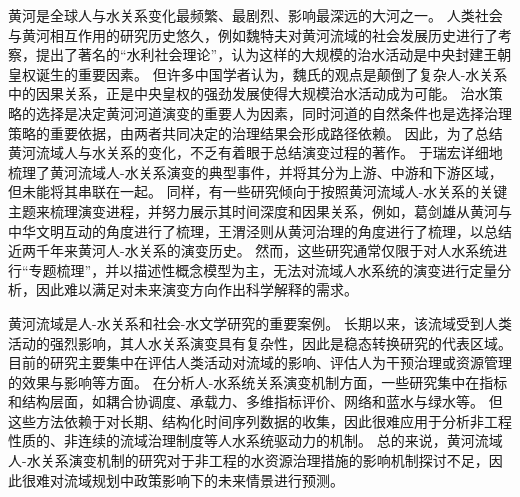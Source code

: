 
黄河是全球人与水关系变化最频繁、最剧烈、影响最深远的大河之一。
人类社会与黄河相互作用的研究历史悠久，例如魏特夫对黄河流域的社会发展历史进行了考察，提出了著名的“水利社会理论”，认为这样的大规模的治水活动是中央封建王朝皇权诞生的重要因素\cite{weitefu1989}。
但许多中国学者认为，魏氏的观点是颠倒了复杂人-水关系中的因果关系，正是中央皇权的强劲发展使得大规模治水活动成为可能\cite{jizhaoding1981}。
治水策略的选择是决定黄河河道演变的重要人为因素，同时河道的自然条件也是选择治理策略的重要依据，由两者共同决定的治理结果会形成路径依赖\cite{WangWeiJing2009}。
因此，为了总结黄河流域人与水关系的变化，不乏有着眼于总结演变过程的著作。
于瑞宏详细地梳理了黄河流域人-水关系演变的典型事件，并将其分为上游、中游和下游区域，但未能将其串联在一起\cite{yuruihong2011}。
同样，有一些研究倾向于按照黄河流域人-水关系的关键主题来梳理演变进程，并努力展示其时间深度和因果关系，例如，葛剑雄从黄河与中华文明互动的角度进行了梳理\cite{gejianxiong2020}，王渭泾则从黄河治理的角度进行了梳理\cite{WangWeiJing2009}，以总结近两千年来黄河人-水关系的演变历史。
然而，这些研究通常仅限于对人水系统进行“专题梳理”，并以描述性概念模型为主，无法对流域人水系统的演变进行定量分析，因此难以满足对未来演变方向作出科学解释的需求。

黄河流域是人-水关系和社会-水文学研究的重要案例。
长期以来，该流域受到人类活动的强烈影响，其人水关系演变具有复杂性，因此是稳态转换研究的代表区域\cite{zuo2022, wang2014}。
目前的研究主要集中在评估人类活动对流域的影响、评估人为干预治理或资源管理的效果与影响等方面\cite{wang2016a, WuXuTong2021, wang2019c}。
在分析人-水系统关系演变机制方面，一些研究集中在指标和结构层面，如耦合协调度\cite{libo2022}、承载力\cite{wang2022d}、多维指标评价\cite{li2020}、网络\cite{song2022}和蓝水与绿水等\cite{zhuo2016a}。
但这些方法依赖于对长期、结构化时间序列数据的收集，因此很难应用于分析非工程性质的、非连续的流域治理制度等人水系统驱动力的机制。
总的来说，黄河流域人-水关系演变机制的研究对于非工程的水资源治理措施的影响机制探讨不足，因此很难对流域规划中政策影响下的未来情景进行预测。

